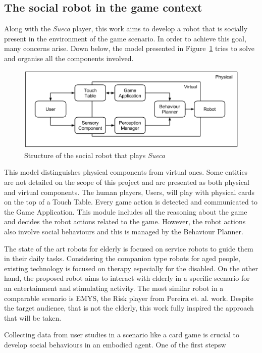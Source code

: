 \subsection{The social robot in the game context}
\label{sec:social_solution}

Along with the \emph{Sueca} player, this work aims to develop a robot that is socially present in the environment of the game scenario.
In order to achieve this goal, many concerns arise.
Down below, the model presented in Figure~\ref{fig:model} tries to solve and organise all the components involved.

\begin{figure}[h!]
  \centering
    \includegraphics[width=1\textwidth]{./img/model}
  \caption{Structure of the social robot that plays \emph{Sueca}}
\label{fig:model}
\end{figure}

This model distinguishes physical components from virtual ones.
Some entities are not detailed on the scope of this project and are presented as both physical and virtual components.
The human players, Users, will play with physical cards on the top of a Touch Table.
Every game action is detected and communicated to the Game Application.
This module includes all the reasoning about the game and decides the robot actions related to the game.
However, the robot actions also involve social behaviours and this is managed by the Behaviour Planner.


The state of the art robots for elderly is focused on service robots to guide them in their daily tasks.
Considering the companion type robots for aged people, existing technology is focused on therapy especially for the disabled.
On the other hand, the proposed robot aims to interact with elderly in a specific scenario for an entertainment and stimulating activity.
The most similar robot in a comparable scenario is EMYS, the Risk player from Pereira et. al. work.
Despite the target audience, that is not the elderly, this work fully inspired the approach that will be taken.

Collecting data from user studies in a scenario like a card game is crucial to develop social behaviours in an embodied agent.
One of the first stepsw





